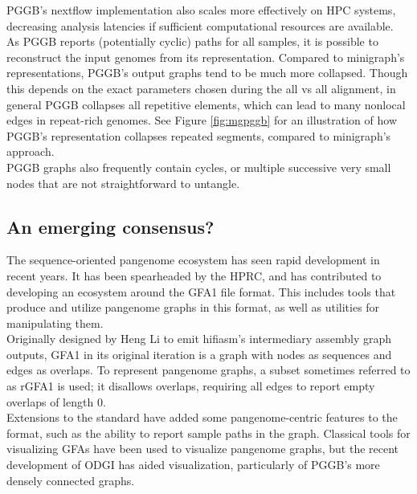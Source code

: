 PGGB's nextflow implementation also scales more effectively on HPC systems, decreasing analysis latencies if sufficient computational resources are available.\\
As PGGB reports (potentially cyclic) paths for all samples, it is possible to reconstruct the input genomes from its representation.
Compared to minigraph's representations, PGGB's output graphs tend to be much more collapsed.
Though this depends on the exact parameters chosen during the all vs all alignment, in general PGGB collapses all repetitive elements, which can lead to many nonlocal edges in repeat-rich genomes\cite{cheng25}.
See Figure \ref{fig:mgpggb} for an illustration of how PGGB's representation collapses repeated segments, compared to minigraph's approach.
\\
PGGB graphs also frequently contain cycles, or multiple successive very small nodes that are not straightforward to untangle\cite{cheng25}. %


\subsection*{An emerging consensus?}

The sequence-oriented pangenome ecosystem has seen rapid development in recent years.
It has been spearheaded by the HPRC, and has contributed to developing an ecosystem around the GFA1 file format.
This includes tools that produce and utilize pangenome graphs in this format, as well as utilities for manipulating them\cite{garrison18, hickey20, gfatools}.\\
Originally designed by Heng Li to emit hifiasm's intermediary assembly graph outputs, GFA1 in its original iteration is a graph with nodes as sequences and edges as overlaps.
To represent pangenome graphs, a subset sometimes referred to as rGFA1 is used; it disallows overlaps, requiring all edges to report empty overlaps of length 0.\\
Extensions to the standard have added some pangenome-centric features to the format, such as the ability to report sample paths in the graph.
Classical tools for visualizing GFAs have been used to visualize pangenome graphs, but the recent development of ODGI has aided visualization, particularly of PGGB's more densely connected graphs\cite{wick15, bandageng, gonella18, guarracino22, cheng25}. %

